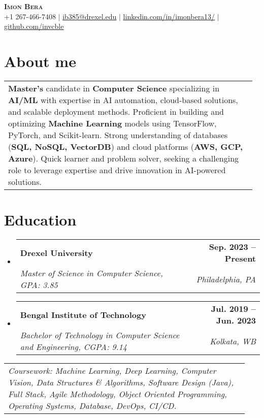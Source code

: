 \documentclass[letterpaper,10pt]{article}
\makeatletter
\newcommand{\resumeSubheading}[4]{
  \vspace{0pt}\item
    \begin{tabular*}{0.97\textwidth}[t]{l@{\extracolsep{\fill}}r}
      \textbf{#1} & \textbf{#2} \\
      \textit{\small#3} & \textit{\small #4} \\
    \end{tabular*}\vspace{-10pt}
}
\newcommand{\resumeSubHeadingListStart}{\begin{itemize}[leftmargin=0.15in, label={}]}
\newcommand{\resumeSubHeadingListEnd}{\end{itemize}}
\makeatother
\begin{document}
\begin{center}
    \textbf{\Huge \scshape Imon Bera} \\ \vspace{1pt}
    \small +1 267-466-7408 $|$ 
    \href{mailto:ib385@drexel.edu}{ib385@drexel.edu} $|$ 
    \href{https://www.linkedin.com/in/imonbera13/}{\underline{linkedin.com/in/imonbera13/}} $|$
    \href{https://github.com/invcble}{\underline{github.com/invcble}\vspace{-10pt}}
\end{center}

\section{About me}
  \vspace{0.2em}
    \hspace{0.15in}\begin{tabular}{p{0.97\linewidth}}
    \textbf{Master’s} candidate in \textbf{Computer Science} specializing in \textbf{AI/ML} with expertise in AI automation, cloud-based solutions, and scalable deployment methods. Proficient in building and optimizing \textbf{Machine Learning} models using TensorFlow, PyTorch, and Scikit-learn. Strong understanding of databases (\textbf{SQL, NoSQL, VectorDB}) and cloud platforms (\textbf{AWS, GCP, Azure}). Quick learner and problem solver, seeking a challenging role to leverage expertise and drive innovation in AI-powered solutions.
\end{tabular}

\section{Education}
\resumeSubHeadingListStart
  \resumeSubheading
    {Drexel University}{Sep. 2023 -- Present}
    {Master of Science in Computer Science, GPA: 3.85}{Philadelphia, PA}
  \resumeSubheading
    {Bengal Institute of Technology}{Jul. 2019 -- Jun. 2023}
    {Bachelor of Technology in Computer Science and Engineering, CGPA: 9.14}{Kolkata, WB}
\resumeSubHeadingListEnd

  \vspace{0.2em}
    \hspace{0.15in}\begin{tabular}{p{0.94\linewidth}}
    \textit{{Coursework}: Machine Learning, Deep Learning, Computer Vision, Data Structures \& Algorithms, Software Design (Java), Full Stack, Agile Methodology, Object Oriented Programming, Operating Systems, Database, DevOps, CI/CD.}
\end{tabular}
\end{document}
